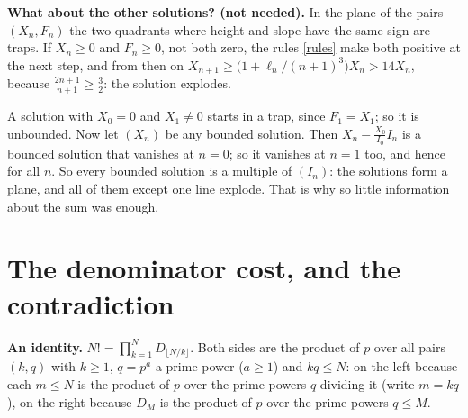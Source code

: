 \documentclass[11pt]{article}
\newcommand{\q}[1]{\medskip\noindent\textbf{#1}}
\begin{document}
\q{What about the other solutions? (not needed).} In the plane of the pairs $(X_n,F_n)$ the two
quadrants where height and slope have the same sign are traps. If $X_n\ge0$ and $F_n\ge0$, not both
zero, the rules \eqref{rules} make both positive at the next step, and from then on
$X_{n+1}\ge\bigl(1+\ell_n/(n+1)^3\bigr)X_n>14X_n$, because $\frac{2n+1}{n+1}\ge\frac32$: the solution
explodes.
\begin{center}
\end{center}
A solution with $X_0=0$ and $X_1\ne0$ starts in a trap, since $F_1=X_1$; so it is unbounded. Now
let $(X_n)$ be any bounded solution. Then $X_n-\frac{X_0}{I_0}I_n$ is a bounded solution that
vanishes at $n=0$; so it vanishes at $n=1$ too, and hence for all $n$. So every bounded solution is
a multiple of $(I_n)$: the solutions form a plane, and all of them except one line explode. That is
why so little information about the sum was enough.

\section{The denominator cost, and the contradiction}

\q{An identity.} $N!=\prod_{k=1}^ND_{\lfloor N/k\rfloor}$. Both sides are the product of $p$ over all
pairs $(k,q)$ with $k\ge1$, $q=p^a$ a prime power ($a\ge1$) and $kq\le N$: on the left because each $m\le N$ is the
product of $p$ over the prime powers $q$ dividing it (write $m=kq$), on the right because $D_M$ is
the product of $p$ over the prime powers $q\le M$.
\end{document}
